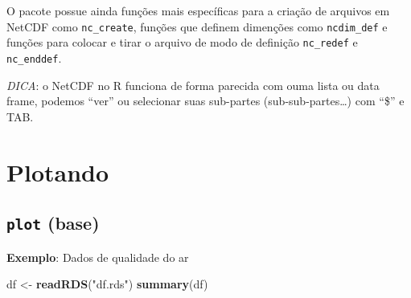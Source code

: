\documentclass[]{book}
\newenvironment{Shaded}{\begin{snugshade}}{\end{snugshade}}
\newcommand{\KeywordTok}[1]{\textcolor[rgb]{0.13,0.29,0.53}{\textbf{#1}}}
\newcommand{\StringTok}[1]{\textcolor[rgb]{0.31,0.60,0.02}{#1}}
\newcommand{\NormalTok}[1]{#1}
\begin{document}
O pacote possue ainda funções mais específicas para a criação de
arquivos em NetCDF como \texttt{nc\_create}, funções que definem
dimenções como \texttt{ncdim\_def} e funções para colocar e tirar o
arquivo de modo de definição \texttt{nc\_redef} e \texttt{nc\_enddef}.

\emph{DICA}: o NetCDF no R funciona de forma parecida com ouma lista ou
data frame, podemos ``ver'' ou selecionar suas sub-partes
(sub-sub-partes\ldots{}) com ``\$'' e TAB.

\chapter{Plotando}\label{plotando}

\section{\texorpdfstring{\texttt{plot}
(base)}{plot (base)}}\label{plot-base}

\textbf{Exemplo}: Dados de qualidade do ar

\begin{Shaded}
\begin{Highlighting}[]
\NormalTok{df <-}\StringTok{ }\KeywordTok{readRDS}\NormalTok{(}\StringTok{"df.rds"}\NormalTok{)}
\KeywordTok{summary}\NormalTok{(df)}
\end{Highlighting}
\end{Shaded}
\end{document}
